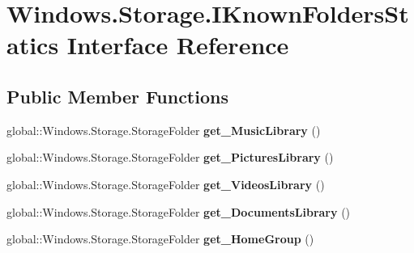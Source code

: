 \hypertarget{interface_windows_1_1_storage_1_1_i_known_folders_statics}{}\section{Windows.\+Storage.\+I\+Known\+Folders\+Statics Interface Reference}
\label{interface_windows_1_1_storage_1_1_i_known_folders_statics}
\subsection*{Public Member Functions}
\begin{DoxyCompactItemize}
\item 
\mbox{\label{interface_windows_1_1_storage_1_1_i_known_folders_statics_adcd49c72e55a38fd059c899befb787e3}} 
global\+::\+Windows.\+Storage.\+Storage\+Folder {\bfseries get\+\_\+\+Music\+Library} ()
\item 
\mbox{\label{interface_windows_1_1_storage_1_1_i_known_folders_statics_a9b9ec6853cba04e273a03844185f6a2a}} 
global\+::\+Windows.\+Storage.\+Storage\+Folder {\bfseries get\+\_\+\+Pictures\+Library} ()
\item 
\mbox{\label{interface_windows_1_1_storage_1_1_i_known_folders_statics_a4e094bf4626dc4a6a6cabddd24d74062}} 
global\+::\+Windows.\+Storage.\+Storage\+Folder {\bfseries get\+\_\+\+Videos\+Library} ()
\item 
\mbox{\label{interface_windows_1_1_storage_1_1_i_known_folders_statics_a13665295b51c3f4818fa4670e5c6a652}} 
global\+::\+Windows.\+Storage.\+Storage\+Folder {\bfseries get\+\_\+\+Documents\+Library} ()
\item 
\mbox{\label{interface_windows_1_1_storage_1_1_i_known_folders_statics_a3873e49e2ba9b30c2e9454dc846f4fdd}} 
global\+::\+Windows.\+Storage.\+Storage\+Folder {\bfseries get\+\_\+\+Home\+Group} ()
\item 
\mbox{\label{interface_windows_1_1_storage_1_1_i_known_folders_statics_a82d93b3f375e9c0c78a55429b4bb9b4b}} 

\end{DoxyCompactItemize}
